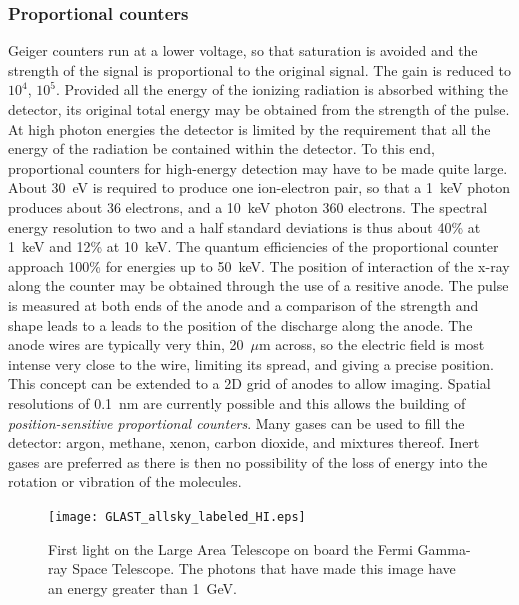 \subsubsection{Proportional counters}
Geiger counters run at a lower voltage, so that 
saturation is avoided and the strength of the signal is proportional to the
original signal. The gain is reduced to $10^4$, $10^5$. Provided all the
energy of the ionizing radiation is absorbed withing the detector, its
original total energy may be obtained from the strength of the pulse. 
At high photon energies the detector is limited by the requirement that 
all the energy of the radiation be contained within the detector. To this
end, proportional counters for high-energy detection may have to be made quite
large. About 30~eV is required to produce one ion-electron pair, so that a
1~keV photon produces about 36 electrons, and a 10~keV photon 360 electrons. 
The spectral energy resolution to two and a half standard deviations is 
thus about 40\% at 1~keV and 12\% at 10~keV. The quantum efficiencies 
of the proportional counter approach 100\% for energies up to
50~keV. The position of interaction of the x-ray along the counter may
be obtained through the use of a resitive anode. The pulse is measured
at both ends of the anode and a comparison of the strength and shape
leads to a leads to the position of the discharge along the anode. The
anode wires are typically very thin, 20~$\mu$m across, so the electric
field is most intense very close to the wire, limiting its spread, and
giving a precise position. This concept can be extended to a 2D grid
of anodes to allow imaging. Spatial resolutions of 0.1~nm are
currently possible and this allows the building of {\it
  position-sensitive proportional counters}. Many
gases can be used to fill the detector: argon, methane, xenon, carbon dioxide,
and mixtures thereof. Inert gases are preferred as there is then no possibility
of the loss of energy into the rotation or vibration of the molecules. 

\begin{figure}[h]
  \centering
	\texttt{[image: GLAST\_allsky\_labeled\_HI.eps]}
  \caption{First light on the Large Area Telescope on board the Fermi Gamma-ray
Space Telescope. The photons that have made this image have an energy
greater than 1~GeV.}
  \label{fig:glast_allsky}
\end{figure}

